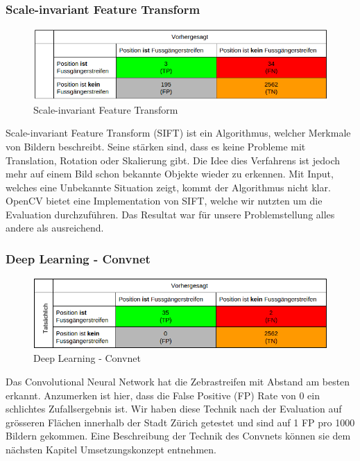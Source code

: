 \subsubsection{\Gls{Scale-invariant Feature Transform}}	
\begin{figure}[H]
\includegraphics[width=\textwidth]{images/sif_conf.png}
\caption[Scale-invariant Feature Transform]{Scale-invariant Feature Transform}
\end{figure}
Scale-invariant Feature Transform (SIFT) ist ein Algorithmus, welcher Merkmale von Bildern beschreibt. Seine stärken sind, dass es keine Probleme mit Translation, Rotation oder Skalierung gibt. Die Idee dies Verfahrens ist jedoch mehr auf einem Bild schon bekannte Objekte wieder zu erkennen. Mit Input, welches eine Unbekannte Situation zeigt, kommt der Algorithmus nicht klar.\\
OpenCV bietet eine Implementation von SIFT, welche wir nutzten um die Evaluation durchzuführen. Das Resultat war für unsere Problemstellung alles andere als ausreichend.
\subsubsection{Deep Learning - Convnet}	
\begin{figure}[H]
\includegraphics[width=\textwidth]{images/deep_conf.png}
\caption[Deep Learning]{\Gls{Deep Learning} - Convnet}
\end{figure}
Das \Gls{Convolutional Neural Network} hat die Zebrastreifen mit Abstand am besten erkannt. Anzumerken ist hier, dass die False Positive (FP) Rate von 0 ein schlichtes Zufallsergebnis ist. Wir haben diese Technik nach der Evaluation auf grösseren Flächen innerhalb der Stadt Zürich getestet und sind auf 1 FP pro 1000 Bildern gekommen. Eine Beschreibung der Technik des \Gls{Convnet}s können sie dem nächsten Kapitel Umsetzungskonzept entnehmen.
\newpage

